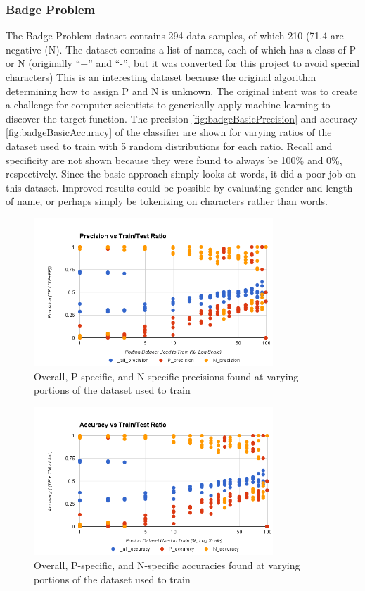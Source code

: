 \subsubsection{Badge Problem}
\label{subsection:badgesBasic}
The Badge Problem dataset \cite{badge} contains 294 data samples, of which 210 (71.4%
are negative (N). The dataset contains a list of names, each of which has a class of P or N (originally ``+'' and ``-'',
but it was converted for this project to avoid special characters) This is an interesting dataset because the original
algorithm determining how to assign P and N is unknown. The original intent was to create a challenge for computer
scientists to generically apply machine learning to discover the target function. The precision
\ref{fig:badgeBasicPrecision} and accuracy \ref{fig:badgeBasicAccuracy} of the classifier are shown for varying ratios
of the dataset used to train with 5 random distributions for each ratio. Recall and specificity are not shown because
they were found to always be 100\% and 0\%, respectively. Since the basic approach simply looks at words, it did a
poor job on this dataset. Improved results could be possible by evaluating gender and length of name, or perhaps
simply be tokenizing on characters rather than words.

\begin{figure}[ht!]
    \centering
    \includegraphics[width=90mm]{img/badge_basic-precision.png}
    \caption{Overall, P-specific, and N-specific precisions found at varying portions of the dataset used to train}
    \label{fig:spamBasicPrecision}
\end{figure}

\begin{figure}[ht!]
    \centering
    \includegraphics[width=90mm]{img/badge_basic-accuracy.png}
    \caption{Overall, P-specific, and N-specific accuracies found at varying portions of the dataset used to train}
    \label{fig:smsBasicAccuracy}
\end{figure}

